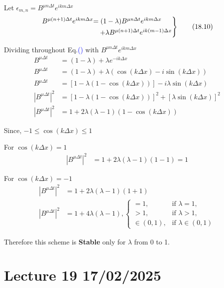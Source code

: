 \documentclass[fleqn,10pt]{SelfArx} %
\newcommand{\myeqref}[1]{Eq.\textcolor{blue}{\textup{(\getrefnumber{#1})}}}
\begin{document}
Let \( \epsilon_{m,n} = B^{\mu n \Delta t} e^{ikm\Delta x} \)  
\begin{align*}
	\begin{rcases}
		B^{\mu(n+1)\Delta t} e^{ikm\Delta x} \!\!\!\!\!\! &= (1-\lambda) B^{\mu n\Delta t} e^{ikm\Delta x} \\ &\quad + \lambda B^{\mu(n+1)\Delta t} e^{ik(m-1)\Delta x}
	\end{rcases} \tag{18.10} \label{eq:18.10}
\end{align*}

Dividing throughout \myeqref{eq:18.10} with \( B^{\mu n\Delta t} e^{ikm\Delta x} \)
\begin{align*}
	B^{\mu\Delta t} &= (1-\lambda) + \lambda e^{-ik\Delta x} \\
	B^{\mu\Delta t} &= (1-\lambda) + \lambda \left(\cos(k\Delta x) - i\sin(k\Delta x)\right) \\
	B^{\mu\Delta t} &= \left[1- \lambda (1 - \cos(k\Delta x))\right]- i\lambda \sin(k\Delta x) \\
	\left|B^{\mu\Delta t}\right|^2 &= \left[1- \lambda (1 - \cos(k\Delta x))\right]^2 + \left[\lambda \sin(k\Delta x)\right]^2 \\
	\left|B^{\mu\Delta t}\right|^2 &= 1 + 2\lambda(\lambda - 1)(1 - \cos(k\Delta x)) \tag{18.11} \label{eq:18.11}
\end{align*}

Since, \(-1 \leq \cos(k\Delta x) \leq 1\)

For \( \cos(k\Delta x) = 1 \)
\begin{align*}
	\left|B^{\mu\Delta t}\right|^2 &= 1 + 2\lambda(\lambda - 1)(1 - 1) = 1
\end{align*}

For \( \cos(k\Delta x) = -1 \)
\begin{align*}
	\left|B^{\mu\Delta t}\right|^2 &= 1 + 2\lambda(\lambda - 1)(1 + 1) \\
	\left|B^{\mu\Delta t}\right|^2 &= 1 + 4\lambda(\lambda - 1),
	\begin{cases}
		=1, & \text{if } \lambda = 1, \\ 
		> 1, & \text{if } \lambda > 1, \\ 
		\in (0,1), & \text{if } \lambda \in (0,1)
	\end{cases}
\end{align*}

Therefore this scheme is \textbf{Stable} only for \( \lambda \) from 0 to 1.

\clearpage

\section{Lecture 19 17/02/2025}
\end{document}
